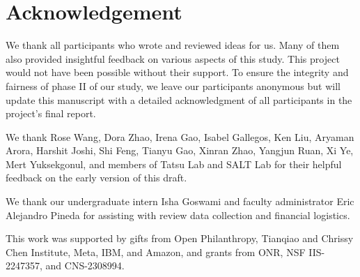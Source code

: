 \section*{Acknowledgement}
\label{sec:ack}

We thank all participants who wrote and reviewed ideas for us. 
Many of them also provided insightful feedback on various aspects of this study. 
This project would not have been possible without their support. 
To ensure the integrity and fairness of phase II of our study, we leave our participants anonymous but will update this manuscript with a detailed acknowledgment of all participants in the project's final report.

We thank Rose Wang, Dora Zhao, Irena Gao, Isabel Gallegos, Ken Liu, Aryaman Arora, Harshit Joshi, Shi Feng, Tianyu Gao, Xinran Zhao, Yangjun Ruan, Xi Ye, Mert Yuksekgonul, and members of Tatsu Lab and SALT Lab for their helpful feedback on the early version of this draft. 

We thank our undergraduate intern Isha Goswami and faculty administrator Eric Alejandro Pineda for assisting with review data collection and financial logistics.  

This work was supported by gifts from Open Philanthropy, Tianqiao and Chrissy Chen Institute, Meta, IBM, and Amazon, and grants from ONR, NSF IIS-2247357, and CNS-2308994.


